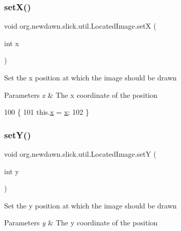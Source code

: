 \subsubsection{\texorpdfstring{set\+X()}{setX()}}
{\footnotesize\ttfamily void org.\+newdawn.\+slick.\+util.\+Located\+Image.\+setX (\begin{DoxyParamCaption}\item[{int}]{x }\end{DoxyParamCaption})\hspace{0.3cm}{\ttfamily [inline]}}

Set the x position at which the image should be drawn


\begin{DoxyParams}{Parameters}
{\em x} & The x coordinate of the position \\
\hline
\end{DoxyParams}

\begin{DoxyCode}
100                             \{
101         this.\mbox{\hyperlink{classorg_1_1newdawn_1_1slick_1_1util_1_1_located_image_a232edc0d0afe15fab0fc849dd163f94c}{x}} = \mbox{\hyperlink{classorg_1_1newdawn_1_1slick_1_1util_1_1_located_image_a232edc0d0afe15fab0fc849dd163f94c}{x}};
102     \}
\end{DoxyCode}
\mbox{\label{classorg_1_1newdawn_1_1slick_1_1util_1_1_located_image_ab881b78d94fea36428b1343cc3e0c4d5}} 
\subsubsection{\texorpdfstring{set\+Y()}{setY()}}
{\footnotesize\ttfamily void org.\+newdawn.\+slick.\+util.\+Located\+Image.\+setY (\begin{DoxyParamCaption}\item[{int}]{y }\end{DoxyParamCaption})\hspace{0.3cm}{\ttfamily [inline]}}

Set the y position at which the image should be drawn


\begin{DoxyParams}{Parameters}
{\em y} & The y coordinate of the position \\
\hline
\end{DoxyParams}

